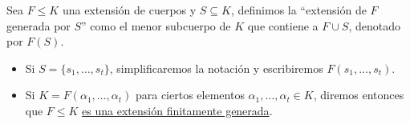 \begin{definicion}
    Sea $F\leq K$ una extensión de cuerpos y $S\subseteq K$, definimos la ``extensión de $F$ generada por $S$'' como el menor subcuerpo de $K$ que contiene a $F\cup S$, denotado por $F(S)$.
    \begin{itemize}
        \item Si $S = \{s_1,\ldots,s_t\}$, simplificaremos la notación y escribiremos $F(s_1,\ldots,s_t)$.
        \item Si $K = F(\alpha_1, \ldots, \alpha_t)$ para ciertos elementos $\alpha_1, \ldots, \alpha_t\in K$, diremos entonces que $F\leq K$ \underline{es una extensión finitamente generada}.
    \end{itemize}
\end{definicion}

